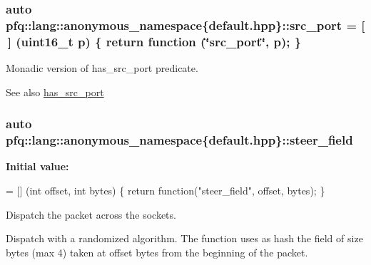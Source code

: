 \subsubsection[{\texorpdfstring{src\+\_\+port}{src_port}}]{\setlength{\rightskip}{0pt plus 5cm}auto pfq\+::lang\+::anonymous\+\_\+namespace\{default.\+hpp\}\+::src\+\_\+port = \mbox{[}$\,$\mbox{]} (uint16\+\_\+t p) \{ return {\bf function} (\char`\"{}src\+\_\+port\char`\"{}, p); \}}\hypertarget{namespacepfq_1_1lang_1_1anonymous__namespace_02default_8hpp_03_ad1645151270994a4f396565b70233b73}{}\label{namespacepfq_1_1lang_1_1anonymous__namespace_02default_8hpp_03_ad1645151270994a4f396565b70233b73}


Monadic version of {\ttfamily has\+\_\+src\+\_\+port} predicate. 

\begin{DoxySeeAlso}{See also}
\hyperlink{namespacepfq_1_1lang_1_1anonymous__namespace_02default_8hpp_03_a964d5ed41f50a1f3a04176f8e54d7a5a}{has\+\_\+src\+\_\+port} 
\end{DoxySeeAlso}
\subsubsection[{\texorpdfstring{steer\+\_\+field}{steer_field}}]{\setlength{\rightskip}{0pt plus 5cm}auto pfq\+::lang\+::anonymous\+\_\+namespace\{default.\+hpp\}\+::steer\+\_\+field}\hypertarget{namespacepfq_1_1lang_1_1anonymous__namespace_02default_8hpp_03_ad861e297a10876e534c5c9053ec23999}{}\label{namespacepfq_1_1lang_1_1anonymous__namespace_02default_8hpp_03_ad861e297a10876e534c5c9053ec23999}
{\bfseries Initial value\+:}
\begin{DoxyCode}
= [] (\textcolor{keywordtype}{int} offset, \textcolor{keywordtype}{int} bytes) \{
                                \textcolor{keywordflow}{return} \textcolor{keyword}{function}(\textcolor{stringliteral}{"steer\_field"}, offset, bytes);
                           \}
\end{DoxyCode}


Dispatch the packet across the sockets. 

Dispatch with a randomized algorithm. The function uses as {\ttfamily hash} the field of {\ttfamily size} bytes (max 4) taken at {\ttfamily offset} bytes from the beginning of the packet. 
